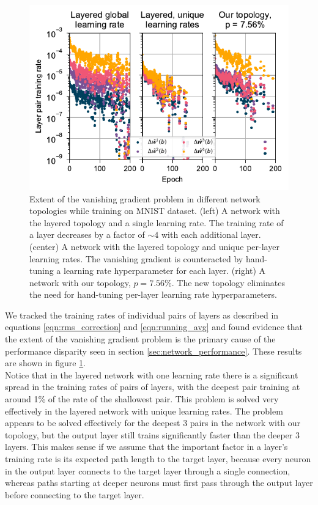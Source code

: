\documentclass[format=sigconf]{acmart}
\newcommand{\npar}{\\\indent}
\begin{document}
\begin{figure}
  \centering
  \includegraphics[width=\columnwidth]{figures/MNIST_individual_layers.pdf}
  \caption{Extent of the vanishing gradient problem in different network topologies while training on MNIST dataset. (left) A network with the layered topology and a single learning rate. The training rate of a layer decreases by a factor of $\sim 4$ with each additional layer. (center) A network with the layered topology and unique per-layer learning rates. The vanishing gradient is counteracted by hand-tuning a learning rate hyperparameter for each layer.  (right) A network with our topology, $p = 7.56\%$. The new topology eliminates the need for hand-tuning per-layer learning rate hyperparameters.}  
  \label{fig:mnist_layers}
\end{figure}

We tracked the training rates of individual pairs of layers as described in equations \ref{eqn:rms_correction} and \ref{eqn:running_avg} and found evidence that the extent of the vanishing gradient problem is the primary cause of the performance disparity seen in section \ref{sec:network_performance}. These results are shown in figure \ref{fig:mnist_layers}.
\npar
Notice that in the layered network with one learning rate there is a significant spread in the training rates of pairs of layers, with the deepest pair training at around 1\% of the rate of the shallowest pair. This problem is solved very effectively in the layered network with unique learning rates. The problem appears to be solved effectively for the deepest 3 pairs in the network with our topology, but the output layer still trains significantly faster than the deeper 3 layers. This makes sense if we assume that the important factor in a layer's training rate is its expected path length to the target layer, because every neuron in the output layer connects to the target layer through a single connection, whereas paths starting at deeper neurons must first pass through the output layer before connecting to the target layer.
\end{document}
